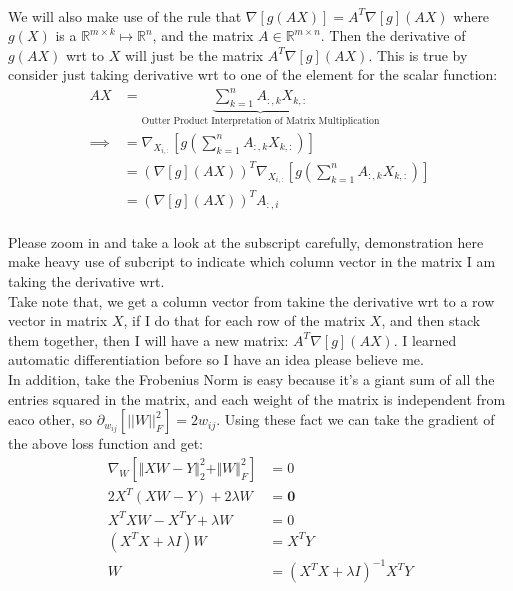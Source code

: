 \documentclass[]{article}
\begin{document}
        \\
        We will also make use of the rule that $\nabla [g(AX)] = A^T\nabla[g](AX)$ where $g(X)$ is a $\mathbb{R}^{m\times k}\mapsto \mathbb{R}^{n}$, and the matrix $A\in \mathbb{R}^{m\times n}$. Then the derivative of $g(AX)$ wrt to $X$ will just be the matrix $A^T\nabla[g](AX)$. This is true by consider just taking derivative wrt to one of the element for the scalar function:
        \begin{align*}\tag{A.6.1.1}\label{eqn:A.6.1.1}
            AX &= \underbrace{\sum_{k = 1}^{n}
                A_{:, k}X_{k, :}}_{\text{Outter Product Interpretation of Matrix Multiplication}}
            \\
            \implies 
            &= \nabla_{X_{i, :}}\left[
                g\left(
                    \sum_{k = 1}^{n}
                    A_{:, k}X_{k, :}
                \right)
            \right]
            \\
            &= (\nabla[g](AX))^T\nabla_{X_{i, :}}
            \left[
                g\left(
                    \sum_{k = 1}^{n}
                    A_{:, k}X_{k, :}
                \right)
            \right]
            \\
            &= 
            (\nabla[g](AX))^TA_{:, i}
        \end{align*}
        \\
        Please zoom in and take a look at the subscript carefully, demonstration here make heavy use of subcript to indicate which column vector in the matrix I am taking the derivative wrt. 
        \\
        Take note that, we get a column vector from takine the derivative wrt to a row vector in matrix $X$, if I do that for each row of the matrix $X$, and then stack them together, then I will have a new matrix: $A^T\nabla[g](AX)$. I learned automatic differentiation before so I have an idea please believe me. 
        \\
        In addition, take the Frobenius Norm is easy because it's a giant sum of all the entries squared in the matrix, and each weight of the matrix is independent from eaco other, so $\partial_{w_{ij}}[||W||_F^2] = 2w_{ij}$. Using these fact we can take the gradient of the above loss function and get: 
        \begin{align*}\tag{A.6.2}\label{eqn:A.6.2}
            \nabla_W \left[
                \Vert XW  - Y\Vert_2^2 + \Vert W\Vert_F^2
            \right] &= 0
            \\
            2X^T(XW - Y) + 2\lambda W &= \mathbf{0}
            \\
            X^TXW - X^TY + \lambda W &= 0 
            \\
            (X^TX + \lambda I)W &= X^TY
            \\
            W &= (X^TX + \lambda I)^{-1}X^TY
        \end{align*}
\end{document}
